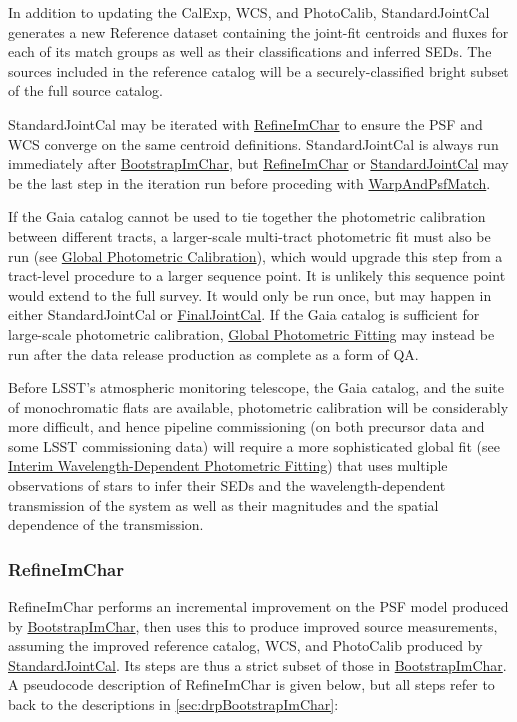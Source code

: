 In addition to updating the CalExp, WCS, and PhotoCalib, StandardJointCal generates a new Reference dataset containing the joint-fit centroids and fluxes for each of its match groups as well as their classifications and inferred SEDs.  The sources included in the reference catalog will be a securely-classified bright subset of the full source catalog.

StandardJointCal may be iterated with \hyperref[sec:drpRefineImChar]{RefineImChar} to ensure the PSF and WCS converge on the same centroid definitions.  StandardJointCal is always run immediately after \hyperref[sec:drpBootstrapImChar]{BootstrapImChar}, but \hyperref[sec:drpRefineImChar]{RefineImChar} or \hyperref[sec:drpStandardJointCal]{StandardJointCal} may be the last step in the iteration run before proceding with \hyperref[sec:drpWarpAndPsfMatch]{WarpAndPsfMatch}.

If the Gaia catalog cannot be used to tie together the photometric calibration between different tracts, a larger-scale multi-tract photometric fit must also be run (see \hyperref[sec:acGlobalPhotometricFit]{Global Photometric Calibration}), which would upgrade this step from a tract-level procedure to a larger sequence point.  It is unlikely this sequence point would extend to the full survey.  It would only be run once, but may happen in either StandardJointCal or \hyperref[sec:drpFinalJointCal]{FinalJointCal}.  If the Gaia catalog is sufficient for large-scale photometric calibration, \hyperref[sec:acGlobalPhotometricFit]{Global Photometric Fitting} may instead be run after the data release production as complete as a form of QA.

Before LSST's atmospheric monitoring telescope, the Gaia catalog, and the suite of monochromatic flats are available, photometric calibration will be considerably more difficult, and hence pipeline commissioning (on both precursor data and some LSST commissioning data) will require a more sophisticated global fit (see \hyperref[sec:acInterimPhotometricFit]{Interim Wavelength-Dependent Photometric Fitting}) that uses multiple observations of stars to infer their SEDs and the wavelength-dependent transmission of the system as well as their magnitudes and the spatial dependence of the transmission.

\subsubsection{RefineImChar}
\label{sec:drpRefineImChar}

RefineImChar performs an incremental improvement on the PSF model produced by \hyperref[sec:drpBootstrapImChar]{BootstrapImChar}, then uses this to produce improved source measurements, assuming the improved reference catalog, WCS, and PhotoCalib produced by \hyperref[sec:drpStandardJointCal]{StandardJointCal}.  Its steps are thus a strict subset of those in \hyperref[sec:drpBootstrapImChar]{BootstrapImChar}.  A pseudocode description of RefineImChar is given below, but all steps refer to back to the descriptions in \ref{sec:drpBootstrapImChar}:

